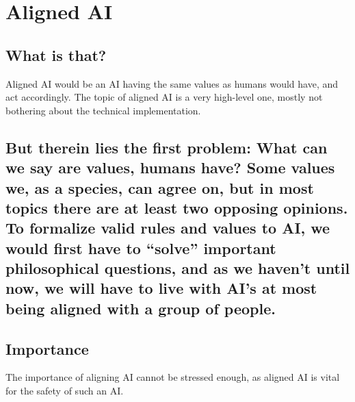 \chapter{Aligned AI}

\section{What is that?}{
Aligned AI would be an AI having the same values as humans would have, and act accordingly. The topic of aligned AI is a very high-level one, mostly not bothering about the technical implementation.}
\section{ But therein lies the first problem: What can we say are values, humans have? Some values we, as a species, can agree on, but in most topics there are at least two opposing opinions. To formalize valid rules and values to AI, we would first have to “solve” important philosophical questions, and as we haven't until now, we will have to live with AI's at most being aligned with a group of people.}
\section{Importance}{
The importance of aligning AI cannot be stressed enough, as aligned AI is vital for the safety of such an AI.
}